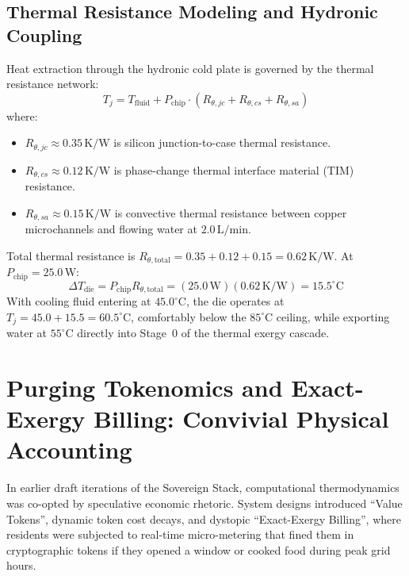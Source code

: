 \subsection{Thermal Resistance Modeling and Hydronic Coupling}
Heat extraction through the hydronic cold plate is governed by the thermal resistance network:
\begin{equation}
T_j = T_{\mathrm{fluid}} + P_{\mathrm{chip}} \cdot \left( R_{\theta,jc} + R_{\theta,cs} + R_{\theta,sa} \right)
\label{eq:junction_temp_network}
\end{equation}
where:
\begin{itemize}
    \item $R_{\theta,jc} \approx 0.35\,\mathrm{K/W}$ is silicon junction-to-case thermal resistance.
    \item $R_{\theta,cs} \approx 0.12\,\mathrm{K/W}$ is phase-change thermal interface material (TIM) resistance.
    \item $R_{\theta,sa} \approx 0.15\,\mathrm{K/W}$ is convective thermal resistance between copper microchannels and flowing water at $2.0\,\mathrm{L/min}$.
\end{itemize}
Total thermal resistance is $R_{\theta,\mathrm{total}} = 0.35 + 0.12 + 0.15 = 0.62\,\mathrm{K/W}$. At $P_{\mathrm{chip}} = 25.0\,\mathrm{W}$:
\begin{equation}
\Delta T_{\mathrm{die}} = P_{\mathrm{chip}} R_{\theta,\mathrm{total}} = (25.0\,\mathrm{W})(0.62\,\mathrm{K/W}) = 15.5^\circ\mathrm{C}
\label{eq:die_temp_rise}
\end{equation}
With cooling fluid entering at $45.0^\circ\mathrm{C}$, the die operates at $T_j = 45.0 + 15.5 = 60.5^\circ\mathrm{C}$, comfortably below the $85^\circ\mathrm{C}$ ceiling, while exporting water at $55^\circ\mathrm{C}$ directly into Stage~0 of the thermal exergy cascade.

\section{Purging Tokenomics and Exact-Exergy Billing: Convivial Physical Accounting}
\label{sec:th_purge_tokenomics}

In earlier draft iterations of the Sovereign Stack, computational thermodynamics was co-opted by speculative economic rhetoric. System designs introduced ``Value Tokens'', dynamic token cost decays, and dystopic ``Exact-Exergy Billing'', where residents were subjected to real-time micro-metering that fined them in cryptographic tokens if they opened a window or cooked food during peak grid hours.

